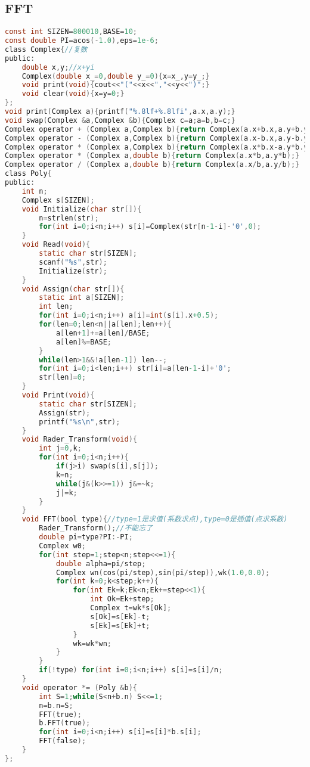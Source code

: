 \subsection{FFT}
\begin{lstlisting}[language=C]
const int SIZEN=800010,BASE=10;
const double PI=acos(-1.0),eps=1e-6;
class Complex{//复数
public:
	double x,y;//x+yi
	Complex(double x_=0,double y_=0){x=x_,y=y_;}
	void print(void){cout<<"("<<x<<","<<y<<")";}
	void clear(void){x=y=0;}
};
void print(Complex a){printf("%.8lf+%.8lfi",a.x,a.y);}
void swap(Complex &a,Complex &b){Complex c=a;a=b,b=c;}
Complex operator + (Complex a,Complex b){return Complex(a.x+b.x,a.y+b.y);}
Complex operator - (Complex a,Complex b){return Complex(a.x-b.x,a.y-b.y);}
Complex operator * (Complex a,Complex b){return Complex(a.x*b.x-a.y*b.y,a.x*b.y+b.x*a.y);}
Complex operator * (Complex a,double b){return Complex(a.x*b,a.y*b);}
Complex operator / (Complex a,double b){return Complex(a.x/b,a.y/b);}
class Poly{
public:
	int n;
	Complex s[SIZEN];
	void Initialize(char str[]){
		n=strlen(str);
		for(int i=0;i<n;i++) s[i]=Complex(str[n-1-i]-'0',0);
	}
	void Read(void){
		static char str[SIZEN];
		scanf("%s",str);
		Initialize(str);
	}
	void Assign(char str[]){
		static int a[SIZEN];
		int len;
		for(int i=0;i<n;i++) a[i]=int(s[i].x+0.5);
		for(len=0;len<n||a[len];len++){
			a[len+1]+=a[len]/BASE;
			a[len]%=BASE;
		}
		while(len>1&&!a[len-1]) len--;
		for(int i=0;i<len;i++) str[i]=a[len-1-i]+'0';
		str[len]=0;
	}
	void Print(void){
		static char str[SIZEN];
		Assign(str);
		printf("%s\n",str);
	}
	void Rader_Transform(void){
		int j=0,k;
		for(int i=0;i<n;i++){
			if(j>i) swap(s[i],s[j]);
			k=n;
			while(j&(k>>=1)) j&=~k;
			j|=k;
		}
	}
	void FFT(bool type){//type=1是求值(系数求点),type=0是插值(点求系数)
		Rader_Transform();//不能忘了
		double pi=type?PI:-PI;
		Complex w0;
		for(int step=1;step<n;step<<=1){
			double alpha=pi/step;
			Complex wn(cos(pi/step),sin(pi/step)),wk(1.0,0.0);
			for(int k=0;k<step;k++){
				for(int Ek=k;Ek<n;Ek+=step<<1){
					int Ok=Ek+step;
					Complex t=wk*s[Ok];
					s[Ok]=s[Ek]-t;
					s[Ek]=s[Ek]+t;
				}
				wk=wk*wn;
			}
		}
		if(!type) for(int i=0;i<n;i++) s[i]=s[i]/n;
	}
	void operator *= (Poly &b){
		int S=1;while(S<n+b.n) S<<=1;
		n=b.n=S;
		FFT(true);
		b.FFT(true);
		for(int i=0;i<n;i++) s[i]=s[i]*b.s[i];
		FFT(false);
	}
};
\end{lstlisting}
